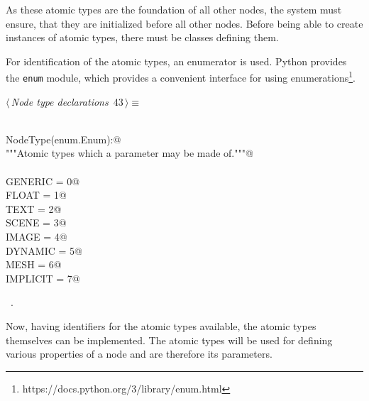 \documentclass[
    a4paper,      %
    10pt,         %
    openright,    %
    notitlepage,  %
    parskip=half, %
]{scrreprt}       %
\theoremstyle{definition}                    %
\begin{document}
As these atomic types are the foundation of all other nodes, the system must
ensure, that they are initialized before all other nodes. Before being able to
create instances of atomic types, there must be classes defining them.

For identification of the atomic types, an enumerator is used. Python provides
the \verb+enum+ module, which provides a convenient interface for using
enumerations\footnote{https://docs.python.org/3/library/enum.html}.

\begin{flushleft} \small
\begin{minipage}{\linewidth}\label{scrap54}\raggedright\small
{} $\langle\,${\itshape Node type declarations}\nobreak\ {\footnotesize {43}}$\,\rangle\equiv$
\vspace{-1exm}
\begin{list}{}{} \item
\mbox{}\lstinline@@\\
\mbox{}\lstinline@class NodeType(enum.Enum):@\\
\mbox{}\lstinline@    """Atomic types which a parameter may be made of."""@\\
\mbox{}\lstinline@@\\
\mbox{}\lstinline@    GENERIC  = 0@\\
\mbox{}\lstinline@    FLOAT    = 1@\\
\mbox{}\lstinline@    TEXT     = 2@\\
\mbox{}\lstinline@    SCENE    = 3@\\
\mbox{}\lstinline@    IMAGE    = 4@\\
\mbox{}\lstinline@    DYNAMIC  = 5@\\
\mbox{}\lstinline@    MESH     = 6@\\
\mbox{}\lstinline@    IMPLICIT = 7@\\
\mbox{}\lstinline@@{\NWsep}
\end{list}
\vspace{-1.5ex}
\footnotesize
\begin{list}{}{\setlength{\itemsep}{-\parsep}\setlength{\itemindent}{-\leftmargin}}
\item \NWtxtMacroRefIn\ .

\item{}
\end{list}
\end{minipage}\vspace{4ex}
\end{flushleft}
Now, having identifiers for the atomic types available, the atomic types
themselves can be implemented. The atomic types will be used for defining
various properties of a node and are therefore its parameters.
\end{document}
